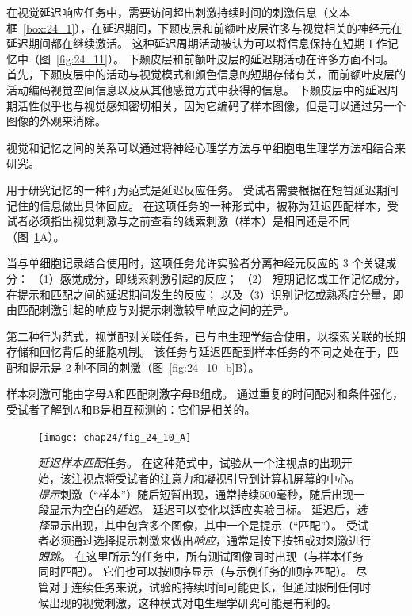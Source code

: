 在视觉延迟响应任务中，需要访问超出刺激持续时间的刺激信息（文本框~\ref{box:24_1}），在延迟期间，下颞皮层和前额叶皮层许多与视觉相关的神经元在延迟期间都在继续激活。
这种延迟周期活动被认为可以将信息保持在短期工作记忆中（图~\ref{fig:24_11}）。
下颞皮层和前额叶皮层的延迟期活动在许多方面不同。
首先，下颞皮层中的活动与视觉模式和颜色信息的短期存储有关，而前额叶皮层的活动编码视觉空间信息以及从其他感觉方式中获得的信息。
下颞皮层中的延迟周期活性似乎也与视觉感知密切相关，因为它编码了样本图像，但是可以通过另一个图像的外观来消除。


\begin{proposition}[视觉与工作记忆的相互作用研究] \label{box:24_1}
	
	\quad \quad 视觉和记忆之间的关系可以通过将神经心理学方法与单细胞电生理学方法相结合来研究。
	
	\quad \quad 用于研究记忆的一种行为范式是延迟反应任务。
	受试者需要根据在短暂延迟期间记住的信息做出具体回应。
	在这项任务的一种形式中，被称为延迟匹配样本，受试者必须指出视觉刺激与之前查看的线索刺激（样本）是相同还是不同（图~\ref{fig:24_10_a}A）。
	
	\quad \quad 当与单细胞记录结合使用时，这项任务允许实验者分离神经元反应的 3 个关键成分：
	（1）感觉成分，即线索刺激引起的反应；
	（2） 短期记忆或工作记忆成分，在提示和匹配之间的延迟期间发生的反应；
	以及（3）识别记忆或熟悉度分量，即由匹配刺激引起的响应与对提示刺激较早响应之间的差异。
	
	\quad \quad 第二种行为范式，视觉配对关联任务，已与电生理学结合使用，以探索关联的长期存储和回忆背后的细胞机制。
	该任务与延迟匹配到样本任务的不同之处在于，匹配和提示是 2 种不同的刺激（图~\ref{fig:24_10_b}B）。
	
	\quad \quad 样本刺激可能由字母A和匹配刺激字母B组成。
	通过重复的时间配对和条件强化，受试者了解到A和B是相互预测的：它们是相关的。
	
\end{proposition}


\begin{figure}[htbp]
	\centering
	\texttt{[image: chap24/fig\_24\_10\_A]}
	\caption{\textit{延迟样本匹配}任务。
		在这种范式中，试验从一个注视点的出现开始，该注视点将受试者的注意力和凝视引导到计算机屏幕的中心。
		\textit{提示}刺激（“样本”）随后短暂出现，通常持续500毫秒，随后出现一段显示为空白的\textit{延迟}。
		延迟可以变化以适应实验目标。
		延迟后，\textit{选择}显示出现，其中包含多个图像，其中一个是提示（“匹配”）。
		受试者必须通过选择提示刺激来做出\textit{响应}，通常是按下按钮或对刺激进行\textit{眼跳}。
		在这里所示的任务中，所有测试图像同时出现（与样本任务同时匹配）。
		它们也可以按顺序显示（与示例任务的顺序匹配）。
		尽管对于连续任务来说，试验的持续时间可能更长，但通过限制任何时候出现的视觉刺激，这种模式对电生理学研究可能是有利的。}
	\label{fig:24_10_a}
\end{figure}


